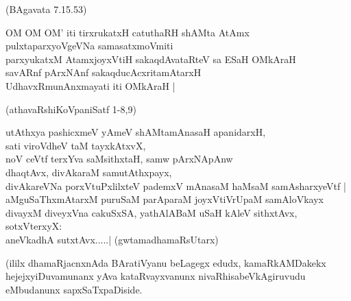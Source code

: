 \begin{itemize}
{\hfill{(BAgavata 7.15.53)}
\item[21.] OM OM OM' iti tirxrukatxH catuthaRH shAMta AtAmx\\\label{146}
pulxtaparxyoVgeVNa samasatxmoVmiti\\
parxyukatxM AtamxjoyxVtiH sakaqdAvataRteV sa ESaH OMkAraH\\
savARnf pArxNAnf sakaqducAcxritamAtarxH \\
UdhavxRmunAnxmayati iti OMkAraH |

\hfill{(athavaRshiKoVpaniSatf 1-8,9)} 
\item[22.] utAthxya pashicxmeV yAmeV shAMtamAnasaH apanidarxH,\\\label{146}
sati viroVdheV taM tayxkAtxvX,\\
noV ceVtf terxYva saMsithxtaH, samw pArxNApAnw\\
dhaqtAvx, divAkaraM samutAthxpayx,\\
divAkareVNa porxVtuPxlilxteV pademxV mAnasaM haMsaM samAsharxyeVtf |\\
aMguSaThxmAtarxM puruSaM parAparaM joyxVtiVrUpaM samAloVkayx\\
divayxM diveyxVna cakuSxSA, yathAlABaM uSaH kAleV sithxtAvx, sotxVterxyX:\\
aneVkadhA sutxtAvx.....|
\hfill{(gwtamadhamaRsUtarx)}}
\end{itemize}

\noindent
(ililx dhamaRjacnxnAda BAratiVyanu beLagegx edudx, kamaRkAMDakekx hejejxyiDuva\break munanx yAva kataRvayxvanunx nivaRhisabeVkAgiruvudu eMbudanunx sapxSaTxpaDi\-side. 

